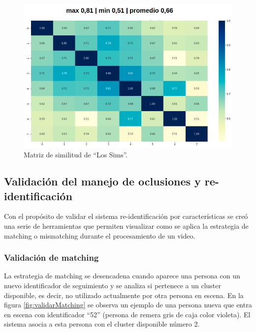 \begin{figure}[ht]
	\centering
	\includegraphics[scale=.65]{./Figures/matrizSimilitud.png}
	\caption{Matriz de similitud de ``Los Sims''.}
	\label{fig:matrizSimilitud}
\end{figure}

\newpage

\subsection{Validación del manejo de oclusiones y re-identificación}

Con el propósito de validar el sistema re-identificación por características se creó una serie de herramientas que permiten visualizar como se aplica la estrategia de matching o mismatching durante el procesamiento de un video.

\subsubsection{Validación de matching}

La estrategia de matching se desencadena cuando aparece una persona con un nuevo identificador de seguimiento y se analiza si pertenece a un cluster disponible, es decir, no utilizado actualmente por otra persona en escena. En la figura \ref{fig:validarMatching} se observa un ejemplo de una persona nueva que entra en escena con identificador ``52'' (persona de remera gris de caja color violeta). El sistema asocia a esta persona con el cluster disponible número 2.

